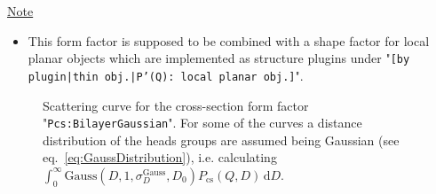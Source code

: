 \noindent
\underline{Note}
\begin{itemize}
  \item This form factor is supposed to be combined with a shape factor for
local planar objects which are implemented as structure  plugins
under "\texttt{[by plugin|thin obj.|P'(Q): local planar
obj.]}".
\end{itemize}

\begin{figure}[htb]
\begin{center}
\hfill
{}
\end{center}
\caption{Scattering curve for the cross-section form factor "\texttt{Pcs:BilayerGaussian}". For some of the curves a distance distribution of
the heads groups are assumed being Gaussian (see eq.\ \ref{eq:GaussDistribution}), i.e. calculating
$\int_0^\infty \mathrm{Gauss}(D,1,\sigma_D^\textrm{Gauss},D_0) P_\text{cs}\left(Q,D\right)\, \mathrm{d}D$.}
\label{fig:BiLayerGaussianProfileIQ}
\end{figure}


